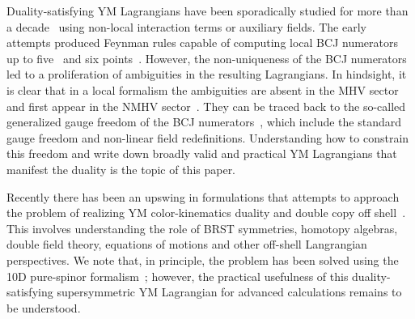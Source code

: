 \documentclass[11pt,a4paper]{article}
\begin{document}
Duality-satisfying YM Lagrangians have been sporadically studied for more than a decade~\cite{Bern:2010yg, Tolotti:2013caa, Ferrero:2020vww,Borsten:2020zgj, Borsten:2020xbt, Beneke:2021ilf, Lam:2021vly,Ben-Shahar:2021doh} using non-local interaction terms or auxiliary fields. The early attempts produced Feynman rules capable of computing local BCJ numerators up to five~\cite{Bern:2010yg} and six points~\cite{Tolotti:2013caa}. However, the non-uniqueness of the BCJ numerators led to a proliferation of ambiguities in the resulting Lagrangians. In hindsight, it is clear that in a local formalism the ambiguities are absent in the MHV sector and first appear in the NMHV sector~\cite{Chen:2019ywi}. They can be traced back to the so-called generalized gauge freedom of the BCJ numerators~\cite{Bern:2008qj,Bern:2010ue}, which include the standard gauge freedom and non-linear field redefinitions. Understanding how to constrain this freedom and write down broadly valid and practical YM Lagrangians that manifest the duality is the topic of this paper.  

Recently there has been an upswing in formulations that attempts to approach the problem of realizing YM color-kinematics duality and double copy off shell~\cite{Anastasiou:2018rdx,Bridges:2019siz,Borsten:2020xbt,Borsten:2020zgj,  Cheung:2021zvb, Campiglia:2021srh, Borsten:2021zir, Cho:2021nim, Borsten:2021rmh, Bonezzi:2022bse, Diaz-Jaramillo:2021wtl,Ben-Shahar:2021zww,Ben-Shahar:2021doh,Godazgar:2022gfw,Bonezzi:2022yuh,Cheung:2022mix,Borsten:2022ouu,Borsten:2022vtg}. This involves understanding the role of BRST symmetries, homotopy algebras, double field theory, equations of motions and other off-shell Langrangian perspectives. We note that, in principle, the problem has been solved using the 10D pure-spinor formalism~\cite{Ben-Shahar:2021doh}; however, the practical usefulness of this duality-satisfying supersymmetric YM Lagrangian for advanced calculations remains to be understood.    
\end{document}
